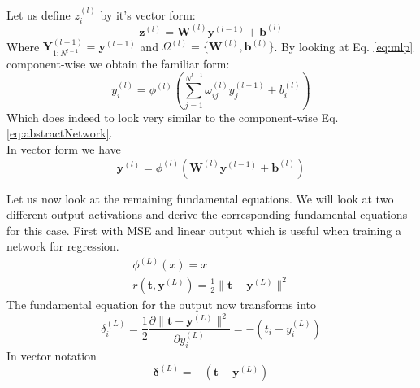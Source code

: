 \documentclass[a4paper,10pt]{article}
\theoremstyle{definition}
\begin{document}
Let us define $z^{(l)}_i$ by it's vector form:
\begin{equation}
\pmb{z}^{(l)} = \pmb{W}^{(l)}\pmb{y}^{(l-1)} + \pmb{b}^{(l)}
\label{eq:mlp}
\end{equation}
Where $\pmb{Y}^{(l-1)}_{1:N^{l-1}} = \pmb{y}^{(l-1)}$ and $\Omega^{(l)} = \{\pmb{W}^{(l)}, \pmb{b}^{(l)} \}$. By looking at Eq. \ref{eq:mlp} component-wise we obtain the familiar form:
\begin{equation}
y_i^{(l)} = \phi^{(l)}(\sum_{j = 1}^{N^{l-1}}\omega_{ij}^{(l)} y_j^{(l-1)} + b^{(l)}_i)
\end{equation}
Which does indeed to look very similar to the component-wise Eq. \ref{eq:abstractNetwork}.\\
In vector form we have 
\begin{equation}
\pmb{y}^{(l)} = \phi^{(l)}(\pmb{W}^{(l)}\pmb{y}^{(l-1)} + \pmb{b}^{(l)})
\end{equation}

Let us now look at the remaining fundamental equations. We will look at two different output activations and derive the corresponding fundamental equations for this case. First with MSE and linear output which is useful when training a network for regression.
\begin{gather}
\phi^{(L)}(x) = x\\
r(\pmb{t},\pmb{y}^{(L)}) =\frac{1}{2} \| \pmb{t} - \pmb{y}^{(L)} \|^2
\label{eq:MLP_SSE_LINEAR}
\end{gather}
The fundamental equation for the output now transforms into
\begin{equation}
\delta_i^{(L)} =\frac{1}{2} \frac{\partial \| \pmb{t} - \pmb{y}^{(L)} \|^2}{\partial y_i^{(L)}} = -(t_i - y_i^{(L)})
\end{equation}
In vector notation
\begin{equation}
\pmb{\delta}^{(L)} = - (\pmb{t} - \pmb{y}^{(L)})
\end{equation}
\end{document}
